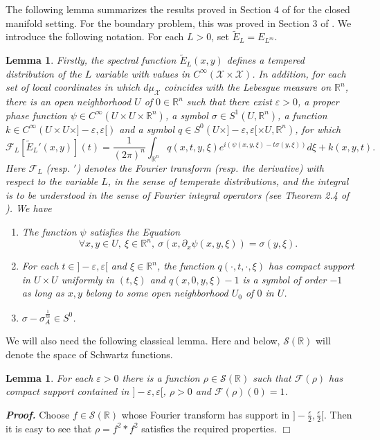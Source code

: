 \documentclass[10pt,twoside]{article}
\newcommand{\fou}{\mathcal{F}}
\newcommand{\eps}{\varepsilon}
\newcommand{\R}{\mathbb{R}}
\newcommand{\man}{\mathcal{X}}
\newenvironment{prf}[1][]
{\vskip 2mm  {\it \bf Proof#1. }}{$\Box$ \vskip 2mm}
\numberwithin{theorem}{section}
\newtheorem{lemma}[theorem]{Lemma}
\begin{document}
The following lemma summarizes the results proved in Section 4 of \cite{ho68} for the closed manifold setting. For the boundary problem, this was proved in Section 3 of \cite{vas83}. We introduce the following notation. For each $L>0$, set $\tilde{E}_L=E_{L^m}$.

\begin{lemma}\label{l.source}
Firstly, the spectral function $\tilde{E}_L(x,y)$ defines a tempered distribution of the $L$ variable with values in $C^\infty(\man\times \man)$. In addition, for each set of local coordinates in which $d\mu_{\man}$ coincides with the Lebesgue measure on $\R^n$, there is an open neighborhood $U$ of $0\in\R^n$ such that there exist $\eps>0$, a proper phase function $\psi \in C^\infty(U\times U\times\R^n)$, a symbol $\sigma\in S^1(U,\R^n)$, a function $k\in C^\infty(U\times U\times]-\eps,\eps[)$ and a symbol $q\in S^0(U\times ]-\eps,\eps[\times U,\R^n)$, for which
\[\fou_L[\tilde{E}_L'(x,y)](t)=\frac{1}{(2\pi)^n}\int_{\R^n}q(x,t,y,\xi)e^{i(\psi(x,y,\xi)-t\sigma(y,\xi))}d\xi + k(x,y,t).\]
Here $\fou_L$ (resp. $'$) denotes the Fourier transform (resp. the derivative) with respect to the variable $L$, in the sense of temperate distributions, and the integral is to be understood in the sense of Fourier integral operators (see Theorem 2.4 of \cite{ho68}). We have
\begin{enumerate}
\item The function $\psi$ satisfies the Equation
\[\forall x,y\in U,\ \xi\in \R^n,\ \sigma(x,\partial_x\psi(x,y,\xi))=\sigma(y,\xi).\]
\item For each $t\in]-\eps,\eps[$ and $\xi\in\R^n$, the function $q(\cdot,t,\cdot,\xi)$ has compact support in $U\times U$ uniformly in $(t,\xi)$ and $q(x,0,y,\xi)-1$ is a symbol of order $-1$ as long as $x,y$ belong to some open neighborhood $U_0$ of $0$ in $U$.
\item $\sigma-\sigma_A^{\frac{1}{m}}\in S^0$.
\end{enumerate}
\end{lemma}
We will also need the following classical lemma. Here and below, $\mathcal{S}(\R)$ will denote the space of Schwartz functions.
\begin{lemma}\label{bump}
For each $\eps>0$ there is a function $\rho\in\mathcal{S}(\R)$ such that $\fou(\rho)$ has compact support contained in $]-\eps,\eps[$, $\rho>0$ and $\fou(\rho)(0)=1$.
\end{lemma}
\begin{prf}
Choose $f\in\mathcal{S}(\R)$ whose Fourier transform has support in $]-\frac{\eps}{2},\frac{\eps}{2}[$. Then it is easy to see that $\rho=f^2*f^2$ satisfies the required properties.
\end{prf}
\end{document}
